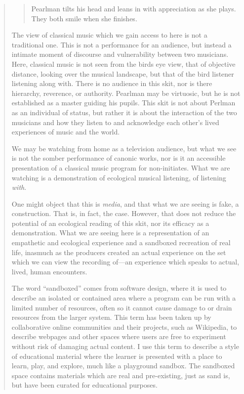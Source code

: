 \documentclass[12pt,letterpaper]{article}
\begin{document}
\begin{quote}
\begin{quote}
	Pearlman tilts his head and leans in with appreciation as she plays.
	They both smile when she finishes.   

	\end{quote}

	The view of classical music which we gain access to here is not a
	traditional one. This is not a performance for an audience, but instead
	a intimate moment of discourse and vulnerability between two 
	musicians. Here, classical music is not seen from the birds eye view,
	that of 
	objective distance, looking over the musical landscape, but that of the 
	bird listener listening along with. There is no audience in this skit, 
	nor is there hierarchy, reverence, or authority. Pearlman may be
	virtuosic, but he is not established as a master guiding his pupils.
	This skit is not about Perlman as an individual of status, but rather
	it is about the interaction of the two musicians and how they listen to 
	and acknowledge each other's lived experiences of music and the world. 
	
	We may be watching from home as a television audience, but what we see
	is not the somber performance of canonic works, nor is it an accessible
	presentation of a classical music program for non-initiates. What we 
	are watching is a demonstration of ecological musical listening, of 
	listening \textit{with}. 

	One might object that this is \textit{media}, and that what we are
	seeing is fake, a construction. That is, in fact, the case. However, 
	that does not reduce the potential of an ecological reading of this 
	skit, nor its efficacy as a demonstration. What we are seeing here is a 
	representation of an empathetic and ecological experience and a 
	sandboxed recreation of real life, inasmuch as the producers created an
	actual experience on the set which we can view the recording of---an 
	experience which speaks to actual, lived, human encounters. 

	The word ``sandboxed'' comes from software design, where it is used
	to describe an isolated or contained area where a program can be run 
	with a limited number of resources, often so it cannot cause damage to
	or drain resources from the larger system. This term has been taken up
	by collaborative online communities and their projects, such as 
	Wikipedia, to describe webpages and other spaces where users are free 
	to experiment without risk of damaging actual 
	content.\autocite{Wiktionary} I use this term
	to describe a style of educational material where the learner is
	presented with a place to learn, play, and explore, much like a
	playground sandbox. The sandboxed space contains materials which are
	real and pre-existing, just as sand is, but have been curated for 
	educational purposes.
	

\end{quote}
\end{document}
